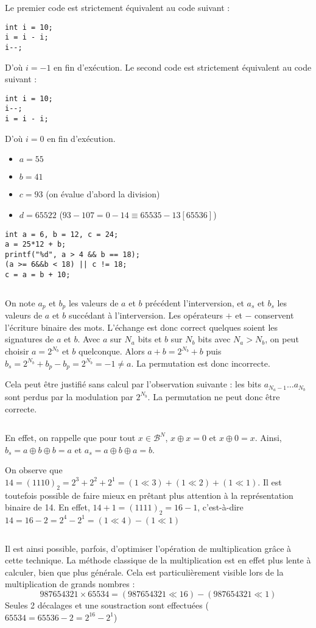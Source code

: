\documentclass[../main.tex]{subfiles}
\begin{document}
Le premier code est strictement équivalent au code suivant :
\begin{verbatim}
int i = 10;
i = i - i;
i--;
\end{verbatim}
D'où $i = -1$ en fin d'exécution. 
Le second code est strictement équivalent au code suivant :
\begin{verbatim}
int i = 10;
i--;
i = i - i;
\end{verbatim}
D'où $i = 0$ en fin d'exécution.
 
\begin{itemize}
	\item $a = 55$
	\item $b = 41$
	\item $c = 93$ (on évalue d'abord la division)
	\item $d = 65522$ ($93 - 107 = 0 - 14 \equiv 65535 - 13 [65536]$)
\end{itemize}
\begin{verbatim}
int a = 6, b = 12, c = 24;
a = 25*12 + b;
printf("%d", a > 4 && b == 18);
(a >= 6&&b < 18) || c != 18;
c = a = b + 10;
\end{verbatim}
\inputminted{c}{solutions/inter_no_side_effect_1.c}
On note $a_{p}$ et $b_{p}$ les valeurs de $a$ et $b$ précédent l'interversion, et $a_{s}$ et $b_{s}$ les valeurs de $a$ et $b$ succédant à l'interversion.  
Les opérateurs $+$ et $-$ conservent l'écriture binaire des mots. L'échange est donc correct quelques soient les signatures de $a$ et $b$. 
Avec $a$ sur $N_{a}$ bits et $b$ sur $N_{b}$ bits avec $N_{a} > N_{b}$, on peut choisir $a = 2^{N_{b}}$ et $b$ quelconque. Alors $a + b = 2^{N_{b}}+b$ puis $b_{s} = 2^{N_{b}}+b_{p} - b_{p} = 2^{N_{b}} = -1 \neq{a}$. La permutation est donc incorrecte.
 
Cela peut être justifié sans calcul par l'observation suivante : les bits $a_{N_{a}-1}\dots a_{N_b}$ sont perdus par la modulation par $2^{N_{b}}$. La permutation ne peut donc être correcte.
 
\inputminted{c}{solutions/inter_no_side_effect_2.c}
En effet, on rappelle que pour tout ${x\in{\mathcal{B}^{N}}}$, $x\oplus{x} = 0$ et $x\oplus{0} = x$. Ainsi, $b_{s} = a\oplus{b}\oplus{b} = a$ et $a_{s} = a\oplus{b}\oplus{a} = b$.
 
 On observe que $14 = (1110)_{2} = 2^{3} + 2^{2} + 2^{1} = (1 \ll 3) + (1 \ll 2) + (1 \ll 1)$. Il est toutefois possible de faire mieux en prêtant plus attention à la représentation binaire de 14. En effet, $14 + 1 = (1111)_{2} = 16 - 1$, c'est-à-dire $14 = 16 - 2 = 2^{4} - 2^{1} = (1 \ll 4) - (1 \ll 1)$
\inputminted{c}{solutions/mult_decalage.c}
Il est ainsi possible, parfois, d'optimiser l'opération de multiplication grâce à cette technique. La méthode classique de la multiplication est en effet plus lente à calculer, bien que plus générale. Cela est particulièrement visible lors de la multiplication de grands nombres :
$$987654321\times{65534} = (987654321 \ll 16) - (987654321 \ll 1)$$
Seules 2 décalages et une soustraction sont effectuées ($65534 = 65536 - 2 = 2^{16} - 2^{1}$)
 
\end{document}
